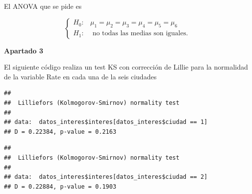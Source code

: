 \documentclass[
]{article}
\newenvironment{Shaded}{\begin{snugshade}}{\end{snugshade}}
\newcommand{\DecValTok}[1]{\textcolor[rgb]{0.00,0.00,0.81}{#1}}
\newcommand{\KeywordTok}[1]{\textcolor[rgb]{0.13,0.29,0.53}{\textbf{#1}}}
\newcommand{\NormalTok}[1]{#1}
\newcommand{\OperatorTok}[1]{\textcolor[rgb]{0.81,0.36,0.00}{\textbf{#1}}}
\begin{document}
El ANOVA que se pide es

\[
\left\{
\begin{array}{ll}
H_0: &  \mu_1=\mu_2=\mu_3=\mu_4=\mu_5=\mu_6\\
H_1: & \mbox{ no  todas las medias son iguales}.
\end{array}
\right.
\]

\textbf{Apartado 3}

El siguiente código realiza un test KS con corrección de Lillie para la
normalidad de la variable Rate en cada una de la seis ciudades

\begin{Shaded}
\end{Shaded}

\begin{verbatim}
## 
##  Lilliefors (Kolmogorov-Smirnov) normality test
## 
## data:  datos_interes$interes[datos_interes$ciudad == 1]
## D = 0.22384, p-value = 0.2163
\end{verbatim}

\begin{Shaded}
\end{Shaded}

\begin{verbatim}
## 
##  Lilliefors (Kolmogorov-Smirnov) normality test
## 
## data:  datos_interes$interes[datos_interes$ciudad == 2]
## D = 0.22884, p-value = 0.1903
\end{verbatim}

\begin{Shaded}
\end{Shaded}
\end{document}
